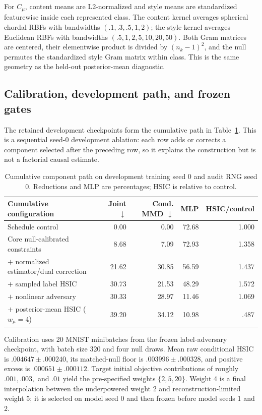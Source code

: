For $C_\mu$, content means are L2-normalized and style means are standardized
featurewise inside each represented class.  The content kernel averages
spherical chordal RBFs with bandwidths $(.1,.3,.5,1,2)$; the style kernel
averages Euclidean RBFs with bandwidths $(.5,1,2,5,10,20,50)$.  Both Gram
matrices are centered, their elementwise product is divided by
$(n_k-1)^2$, and the null permutes the standardized style Gram matrix within
class.  This is the same geometry as the held-out posterior-mean diagnostic.

\subsection{Calibration, development path, and frozen gates}

The retained development checkpoints form the cumulative path in
Table~\ref{tab:fact-components}.  This is a sequential seed-0 development
ablation: each row adds or corrects a component selected after the preceding
row, so it explains the construction but is not a factorial causal estimate.

\begin{table}[ht]
\caption{Cumulative component path on development training seed 0 and audit
RNG seed 0.  Reductions and MLP are percentages; HSIC is relative to control.}
\label{tab:fact-components}
\centering
\scriptsize
\setlength{\tabcolsep}{4pt}
\begin{tabular}{lrrrr}
\toprule
Cumulative configuration & Joint $\downarrow$ & Cond. MMD $\downarrow$ & MLP & HSIC/control \\
\midrule
Schedule control & 0.00 & 0.00 & 72.68 & 1.000 \\
Core null-calibrated constraints & 8.68 & 7.09 & 72.93 & 1.358 \\
$+$ normalized estimator/dual correction & 21.62 & 30.85 & 56.59 & 1.437 \\
$+$ sampled label HSIC & 30.73 & 21.53 & 48.29 & 1.572 \\
$+$ nonlinear adversary & 30.33 & 28.97 & 11.46 & 1.069 \\
$+$ posterior-mean HSIC ($w_\mu=4$) & 39.20 & 34.12 & 10.98 & .487 \\
\bottomrule
\end{tabular}
\end{table}

Calibration uses 20 MNIST minibatches from the frozen label-adversary
checkpoint, with batch size 320 and four null draws.  Mean raw conditional
HSIC is $.004647\pm.000240$, its matched-null floor is
$.003996\pm.000328$, and positive excess is $.000651\pm.000112$.  Target
initial objective contributions of roughly $.001,.003,$ and $.01$ yield the
pre-specified weights $\{2,5,20\}$.  Weight 4 is a final interpolation between
the underpowered weight 2 and reconstruction-limited weight 5; it is selected
on model seed 0 and then frozen before model seeds 1 and 2.

